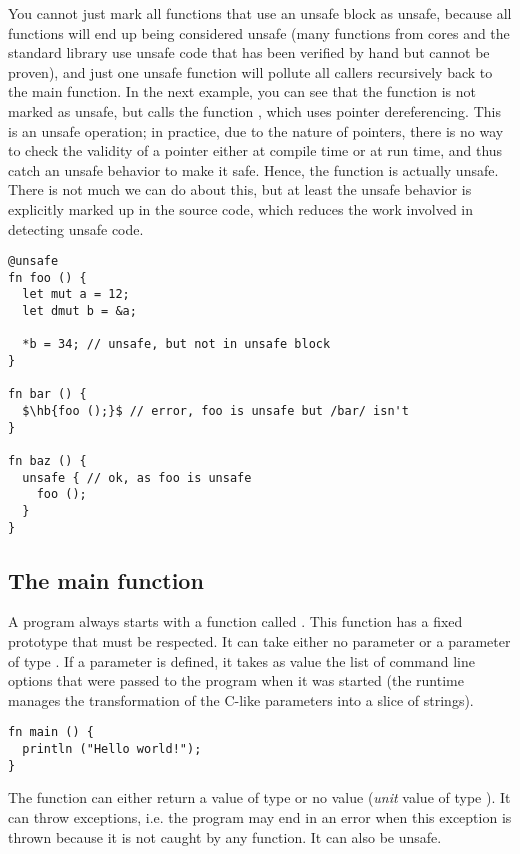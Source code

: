 You cannot just mark all functions that use an unsafe block as unsafe, because
all functions will end up being considered unsafe (many functions from cores and
the standard library use unsafe code that has been verified by hand but cannot
be proven), and just one unsafe function will pollute all callers recursively
back to the main function. In the next example, you can see that the function
 is not marked as unsafe, but calls the function , which
uses pointer dereferencing. This is an unsafe operation; in practice, due to the
nature of pointers, there is no way to check the validity of a pointer either at
compile time or at run time, and thus catch an unsafe behavior to make it safe.
Hence, the  function is actually unsafe. There is not much we can do
about this, but at least the unsafe behavior is explicitly marked up in the
source code, which reduces the work involved in detecting unsafe code.

\begin{lstlisting}[style=coloredverbatim, escapechar=$]
@unsafe
fn foo () {
  let mut a = 12;
  let dmut b = &a;

  *b = 34; // unsafe, but not in unsafe block
}

fn bar () {
  $\hb{foo ();}$ // error, foo is unsafe but /bar/ isn't
}

fn baz () {
  unsafe { // ok, as foo is unsafe
    foo ();
  }
}
\end{lstlisting}

\subsection{The main function}

A program always starts with a function called . This function has
a fixed prototype that must be respected. It can take either no parameter or a
parameter of type \token{[[c8]]}. If a parameter is defined, it takes as value
the list of command line options that were passed to the program when it was
started (the runtime manages the transformation of the C-like parameters
 into a slice of strings).

\begin{lstlisting}[style=coloredverbatim, caption=The simplest main function prototype]
fn main () {
  println ("Hello world!");
}
\end{lstlisting}

The function can either return a value of type  or no value
(\textit{unit} value of type ). It can throw exceptions, i.e. the
program may end in an error when this exception is thrown because it is not
caught by any function. It can also be unsafe.

